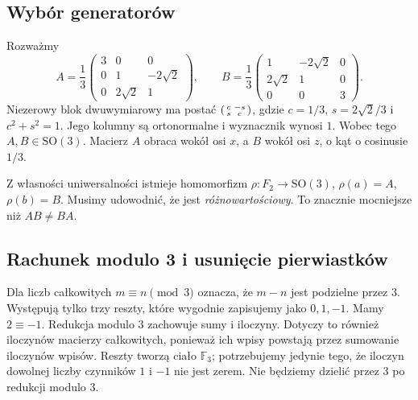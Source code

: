 \documentclass[11pt,a4paper]{article}
\numberwithin{equation}{section}
\theoremstyle{plain}
\theoremstyle{definition}
\theoremstyle{remark}
\newcommand{\F}{\mathbb F}
\begin{document}
\subsection{Wybór generatorów}
Rozważmy
\begin{equation}\label{eq:5-1}
 A=\frac13\begin{pmatrix}3&0&0\\0&1&-2\sqrt2\\0&2\sqrt2&1\end{pmatrix},\qquad
 B=\frac13\begin{pmatrix}1&-2\sqrt2&0\\2\sqrt2&1&0\\0&0&3\end{pmatrix}.
\end{equation}
Niezerowy blok dwuwymiarowy ma postać $\begin{psmallmatrix}c&-s\\s&c\end{psmallmatrix}$, gdzie $c=1/3$, $s=2\sqrt2/3$ i $c^2+s^2=1$. Jego kolumny są ortonormalne i wyznacznik wynosi $1$. Wobec tego $A,B\in\mathrm{SO}(3)$. Macierz $A$ obraca wokół osi $x$, a $B$ wokół osi $z$, o kąt o cosinusie $1/3$.

Z własności uniwersalności istnieje homomorfizm $\rho:F_2\to\mathrm{SO}(3)$, $\rho(a)=A$, $\rho(b)=B$. Musimy udowodnić, że jest \emph{różnowartościowy}. To znacznie mocniejsze niż $AB\ne BA$.

\subsection{Rachunek modulo 3 i usunięcie pierwiastków}
Dla liczb całkowitych $m\equiv n\pmod3$ oznacza, że $m-n$ jest podzielne przez $3$. Występują tylko trzy reszty, które wygodnie zapisujemy jako $0,1,-1$. Mamy $2\equiv-1$. Redukcja modulo $3$ zachowuje sumy i iloczyny. Dotyczy to również iloczynów macierzy całkowitych, ponieważ ich wpisy powstają przez sumowanie iloczynów wpisów. Reszty tworzą ciało $\F_3$; potrzebujemy jedynie tego, że iloczyn dowolnej liczby czynników $1$ i $-1$ nie jest zerem. Nie będziemy dzielić przez $3$ po redukcji modulo $3$.
\end{document}
